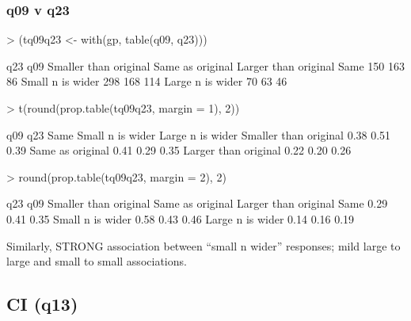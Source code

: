 \documentclass[11pt]{article}
\begin{document}
\subsubsection{q09 v q23}
\label{sec-1-3-2}
\begin{Schunk}
\begin{Sinput}
> (tq09q23 <- with(gp, table(q09, q23)))
\end{Sinput}
\begin{Soutput}
                  q23
q09                Smaller than original Same as original Larger than original
  Same                               150              163                   86
  Small n is wider                   298              168                  114
  Large n is wider                    70               63                   46
\end{Soutput}
\begin{Sinput}
> t(round(prop.table(tq09q23, margin = 1), 2))
\end{Sinput}
\begin{Soutput}
                       q09
q23                     Same Small n is wider Large n is wider
  Smaller than original 0.38             0.51             0.39
  Same as original      0.41             0.29             0.35
  Larger than original  0.22             0.20             0.26
\end{Soutput}
\begin{Sinput}
> round(prop.table(tq09q23, margin = 2), 2)
\end{Sinput}
\begin{Soutput}
                  q23
q09                Smaller than original Same as original Larger than original
  Same                              0.29             0.41                 0.35
  Small n is wider                  0.58             0.43                 0.46
  Large n is wider                  0.14             0.16                 0.19
\end{Soutput}
\end{Schunk}





Similarly, STRONG association between ``small n wider'' responses; mild large to large and small to small associations.

\subsection{CI (q13)}
\label{sec-1-4}
\end{document}
